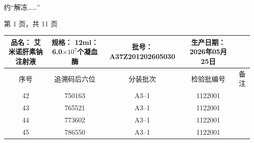 \documentclass[UTF8,10pt,a4paper,fontset=fandol]{ctexart}
\newcommand{\fieldvalue}[1]{#1}
\newcommand{\handwritten}[1]{#1}
\begin{document}
\handwritten{约“解冻……”}

\begin{center}
第 1 页，共 11 页
\end{center}

\newpage

\begin{center}
\small
\begin{tabular}{|c|c|c|c|c|}
\hline
品名：%
\fieldvalue{艾米诺肝素钠注射液}
&
规格：%
\fieldvalue{12ml：6.0$\times 10^{7}$个凝血酶}
&
批号：%
\fieldvalue{A37Z201202605030}
&
生产日期：%
\fieldvalue{2026年05月25日}
& \\ \hline
序号 & 追溯码后六位 & 分装批次 & 检验批编号 & 备注 \\ \hline

\fieldvalue{42} &
\fieldvalue{750163} &
\fieldvalue{A3--1} &
\fieldvalue{1122001} & \\ \hline

\fieldvalue{43} &
\fieldvalue{765521} &
\fieldvalue{A3--1} &
\fieldvalue{1122001} & \\ \hline

\fieldvalue{44} &
\fieldvalue{773602} &
\fieldvalue{A3--1} &
\fieldvalue{1122001} & \\ \hline

\fieldvalue{45} &
\fieldvalue{786550} &
\fieldvalue{A3--1} &
\fieldvalue{1122001} & \\ \hline


\end{tabular}
\end{center}
\end{document}
